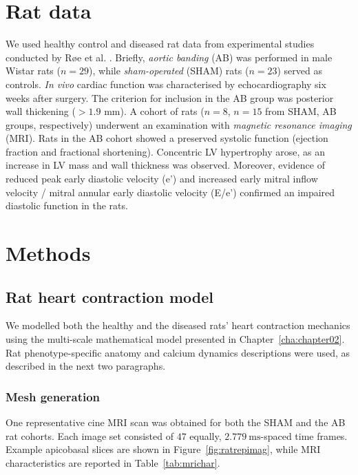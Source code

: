 \section{Rat data}\label{sec:ch4rat_data}
We used healthy control and diseased rat data from experimental studies conducted by R{\o}e et al. \cite{Roe:2017}. Briefly, \textit{aortic banding} (\acs{AB}) was performed in male Wistar rats ($n=29$), while \textit{sham-operated} (\acs{SHAM}) rats ($n=23$) served as controls. \textit{In vivo} cardiac function was characterised by echocardiography six weeks after surgery. The criterion for inclusion in the AB group was posterior wall thickening ($>1.9$ mm). A cohort of rats ($n=8$, $n=15$ from SHAM, AB groups, respectively) underwent an examination with \textit{magnetic resonance imaging} (\acs{MRI}). Rats in the AB cohort showed a preserved systolic function (ejection fraction and fractional shortening). Concentric LV hypertrophy arose, as an increase in LV mass and wall thickness was observed. Moreover, evidence of reduced peak early diastolic velocity (e’) and increased early mitral inflow velocity / mitral annular early diastolic velocity (E/e’) confirmed an impaired diastolic function in the rats.


%
%
%
\section{Methods}\label{sec:ch4methods}


%
%
%
\subsection{Rat heart contraction model}\label{sec:ch4ratheartcontractionmodel}
We modelled both the healthy and the diseased rats' heart contraction mechanics using the multi-scale mathematical model presented in Chapter~\ref{cha:chapter02}. Rat phenotype-specific anatomy and calcium dynamics descriptions were used, as described in the next two paragraphs.


%
%
%
\subsubsection{Mesh generation}\label{sec:ch4meshgeneration}
One representative cine MRI scan was obtained for both the SHAM and the AB rat cohorts. Each image set consisted of $47$ equally, $\SI{2.779}{\milli\second}$-spaced time frames. Example apicobasal slices are shown in Figure~\ref{fig:ratrepimag}, while MRI characteristics are reported in Table~\ref{tab:mrichar}.

